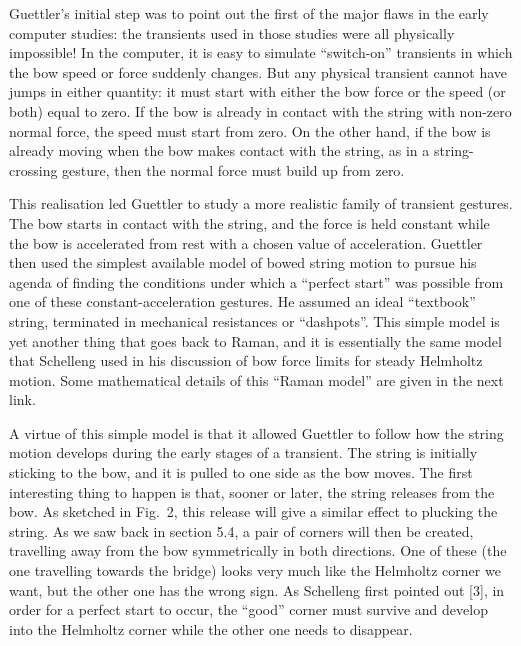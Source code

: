 
  Guettler's initial step was to point out the first of the major flaws in the 
  early computer studies: the transients used in those studies were all 
  physically impossible! In the computer, it is easy to simulate “switch-on” 
  transients in which the bow speed or force suddenly changes. But any physical 
  transient cannot have jumps in either quantity: it must start with either the 
  bow force or the speed (or both) equal to zero. If the bow is already in 
  contact with the string with non-zero normal force, the speed must start from 
  zero. On the other hand, if the bow is already moving when the bow makes 
  contact with the string, as in a string-crossing gesture, then the normal 
  force must build up from zero. 

  This realisation led Guettler to study a more realistic family of transient 
  gestures. The bow starts in contact with the string, and the force is held 
  constant while the bow is accelerated from rest with a chosen value of 
  acceleration. Guettler then used the simplest available model of bowed string 
  motion to pursue his agenda of finding the conditions under which a “perfect 
  start” was possible from one of these constant-acceleration gestures. He 
  assumed an ideal “textbook” string, terminated in mechanical resistances or 
  “dashpots”. This simple model is yet another thing that goes back to Raman, 
  and it is essentially the same model that Schelleng used in his discussion of 
  bow force limits for steady Helmholtz motion. Some mathematical details of 
  this “Raman model” are given in the next link. 

  A virtue of this simple model is that it allowed Guettler to follow how the 
  string motion develops during the early stages of a transient. The string is 
  initially sticking to the bow, and it is pulled to one side as the bow moves. 
  The first interesting thing to happen is that, sooner or later, the string 
  releases from the bow. As sketched in Fig.\ 2, this release will give a 
  similar effect to plucking the string. As we saw back in section 5.4, a pair 
  of corners will then be created, travelling away from the bow symmetrically 
  in both directions. One of these (the one travelling towards the bridge) 
  looks very much like the Helmholtz corner we want, but the other one has the 
  wrong sign. As Schelleng first pointed out [3], in order for a perfect start 
  to occur, the “good” corner must survive and develop into the Helmholtz 
  corner while the other one needs to disappear. 

